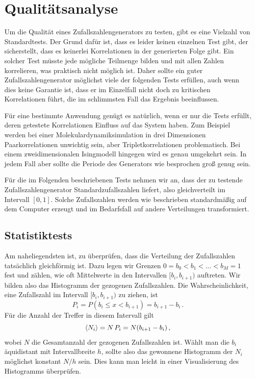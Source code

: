 \section{Qualitätsanalyse}

Um die Qualität eines Zufallszahlengenerators zu testen, gibt es eine
Vielzahl von Standardtests. Der Grund dafür ist, dass es leider keinen
einzelnen Test gibt, der sicherstellt, dass es keinerlei Korrelationen
in der generierten Folge gibt. Ein solcher Test müsste jede mögliche
Teilmenge bilden und mit allen Zahlen korrelieren, was praktisch nicht
möglich ist. Daher sollte ein guter Zufallszahlengenerator möglichst
viele der folgenden Tests erfüllen, auch wenn dies keine Garantie ist,
dass er im Einzelfall nicht doch zu kritischen Korrelationen führt,
die im schlimmsten Fall das Ergebnis beeinflussen.

Für eine bestimmte Anwendung genügt es natürlich, wenn er nur die
Tests erfüllt, deren getestete Korrelationen Einfluss auf das System
haben. Zum Beispiel werden bei einer Molekulardynamiksimulation in
drei Dimensionen Paarkorrelationen unwichtig sein, aber
Tripletkorrelationen problematisch.  Bei einem zweidimensionalen
Isingmodell hingegen wird es genau umgekehrt sein.  In jedem Fall aber
sollte die Periode des Generators wie besprochen groß genug sein.

Für die im Folgenden beschriebenen Tests nehmen wir an, dass der zu
testende Zufallszahlengenerator Standardzufallszahlen liefert, also
gleichverteilt im Intervall $[0,1]$.  Solche Zufallszahlen werden wie
beschrieben standardmäßig auf dem Computer erzeugt und im Bedarfsfall
auf andere Verteilungen transformiert.

\subsection{Statistiktests}

Am naheliegendsten ist, zu überprüfen, dass die Verteilung der Zufallszahlen tatsächlich gleichförmig ist. Dazu legen wir Grenzen $0 = b_0 < b_1 < \ldots < b_M = 1$ fest und zählen, wie oft Mittelwerte in den Intervallen $[b_i,b_{i+1})$ auftreten. Wir bilden also das Histogramm der gezogenen Zufallszahlen. Die Wahrscheinlichkeit, eine Zufallszahl im Intervall $[b_i,b_{i+1})$ zu ziehen, ist
\begin{equation}
	P_i = P(b_i \le x < b_{i+1}) = b_{i+1} - b_i\,.
\end{equation}
Für die Anzahl der Treffer in diesem Intervall gilt
\begin{equation}
	\left\langle{N_i}\right\rangle = N\,P_i = N (b_{i+1} - b_i)\,,
\end{equation}
wobei $N$ die Gesamtanzahl der gezogenen Zufallszahlen ist. Wählt man die $b_i$ äquidistant mit Intervallbreite $h$, sollte also das gewonnene Histogramm der $N_i$ möglichst konstant $N/h$ sein. Dies kann man leicht in einer Visualisierung des Histogramms überprüfen.

